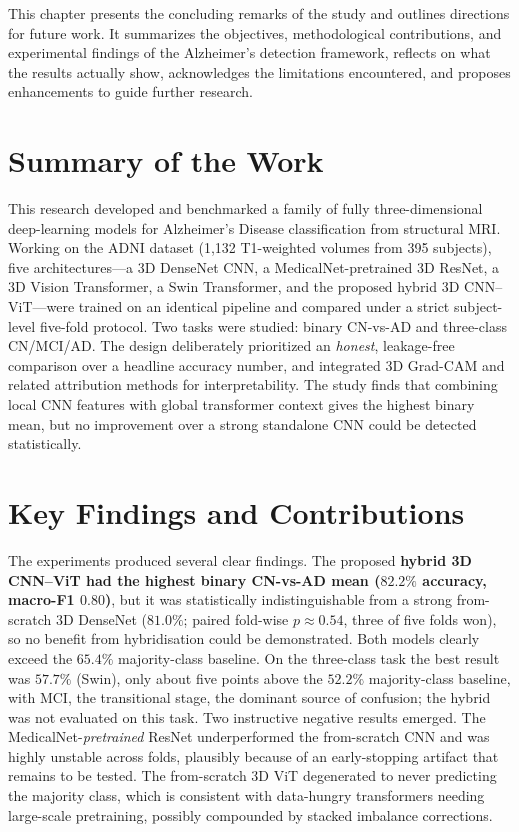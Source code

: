 
This chapter presents the concluding remarks of the study and outlines directions for future work. It summarizes the objectives, methodological contributions, and experimental findings of the Alzheimer's detection framework, reflects on what the results actually show, acknowledges the limitations encountered, and proposes enhancements to guide further research.
\section{Summary of the Work}
This research developed and benchmarked a family of fully three-dimensional deep-learning models for Alzheimer's Disease classification from structural MRI. Working on the ADNI dataset (1{,}132 T1-weighted volumes from 395 subjects), five architectures—a 3D DenseNet CNN, a MedicalNet-pretrained 3D ResNet, a 3D Vision Transformer, a Swin Transformer, and the proposed hybrid 3D CNN–ViT—were trained on an identical pipeline and compared under a strict subject-level five-fold protocol. Two tasks were studied: binary CN-vs-AD and three-class CN/MCI/AD. The design deliberately prioritized an \emph{honest}, leakage-free comparison over a headline accuracy number, and integrated 3D Grad-CAM and related attribution methods for interpretability. The study finds that combining local CNN features with global transformer context gives the highest binary mean, but no improvement over a strong standalone CNN could be detected statistically.

\section{Key Findings and Contributions}
The experiments produced several clear findings. The proposed \textbf{hybrid 3D CNN–ViT had the highest binary CN-vs-AD mean ($82.2\%$ accuracy, macro-F1 $0.80$)}, but it was statistically indistinguishable from a strong from-scratch 3D DenseNet ($81.0\%$; paired fold-wise $p\approx0.54$, three of five folds won), so no benefit from hybridisation could be demonstrated. Both models clearly exceed the $65.4\%$ majority-class baseline. On the three-class task the best result was $57.7\%$ (Swin), only about five points above the $52.2\%$ majority-class baseline, with MCI, the transitional stage, the dominant source of confusion; the hybrid was not evaluated on this task. Two instructive negative results emerged. The MedicalNet-\emph{pretrained} ResNet underperformed the from-scratch CNN and was highly unstable across folds, plausibly because of an early-stopping artifact that remains to be tested. The from-scratch 3D ViT degenerated to never predicting the majority class, which is consistent with data-hungry transformers needing large-scale pretraining, possibly compounded by stacked imbalance corrections.

